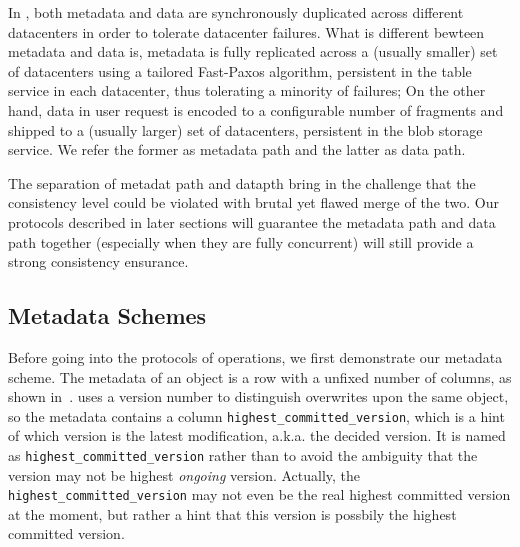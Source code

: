 In {\name}, both metadata and data are synchronously duplicated across different
datacenters in order to tolerate datacenter failures. What is different bewteen metadata
and data is, metadata is fully replicated across a (usually smaller) set of datacenters using
a tailored Fast-Paxos algorithm, persistent in the table service in each datacenter, thus
tolerating a minority of failures; On the other hand, data in user request is encoded to
a configurable number of fragments and shipped to a (usually larger) set of datacenters,
persistent in the blob storage service. We refer the former as metadata path and the latter
as data path.


The separation of metadat path and datapth bring in the challenge that the consistency level
could be violated with brutal yet flawed merge of the two. Our protocols described in later
sections will guarantee the metadata path and data path together (especially when they are
fully concurrent) will still provide a strong consistency ensurance.




\subsection{Metadata Schemes}
Before going into the protocols of {\name} operations, we first demonstrate our metadata
scheme. The metadata of an object is a row with a unfixed number of columns, as shown
in~. {\name} uses a version number to distinguish overwrites upon the same
object, so the metadata contains a column \texttt{highest\_committed\_version}, which is
a hint of which version is the latest modification, a.k.a. the decided version. It is named
as \texttt{highest\_committed\_version} rather than  to avoid the
ambiguity that the version may not be highest \emph{ongoing} version. Actually, the
\texttt{highest\_committed\_version} may not even be the real highest committed version at
the moment, but rather a hint that this version is possbily the highest committed version.


